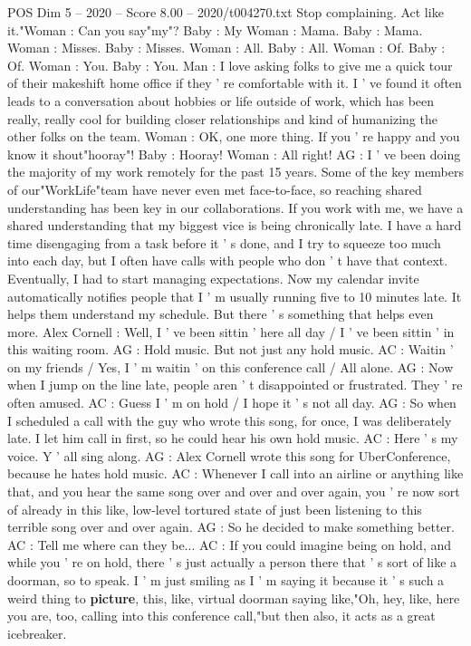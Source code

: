 \begin{textsample}{POS Dim 5 – 2020 – Score 8.00 – 2020/t004270.txt}
Stop complaining.
Act like it."Woman : Can you say"my"?
Baby : My Woman : Mama.
Baby : Mama.
Woman : Misses.
Baby : Misses.
Woman : All.
Baby : All.
Woman : Of.
Baby : Of.
Woman : You.
Baby : You.
Man : I love asking folks to give me a quick tour of their makeshift home office if they ' re comfortable with it.
I ' ve found it often leads to a conversation about hobbies or life outside of work, which has been really, really cool for building closer relationships and kind of humanizing the other folks on the team.
Woman : OK, one more thing.
If you ' re happy and you know it shout"hooray"!
Baby : Hooray!
Woman : All right!
AG : I ' ve been doing the majority of my work remotely for the past 15 years.
Some of the key members of our"WorkLife"team have never even met face-to-face, so reaching shared understanding has been key in our collaborations.
If you work with me, we have a shared understanding that my biggest vice is being chronically late.
I have a hard time disengaging from a task before it ' s done, and I try to squeeze too much into each day, but I often have calls with people who don ' t have that context.
Eventually, I had to start managing expectations.
Now my calendar invite automatically notifies people that I ' m usually running five to 10 minutes late.
It helps them understand my schedule.
But there ' s something that helps even more.
Alex Cornell : Well, I ' ve been sittin ' here all day / I ' ve been sittin ' in this waiting room.
AG : Hold music.
But not just any hold music.
AC : Waitin ' on my friends / Yes, I ' m waitin ' on this conference call / All alone.
AG : Now when I jump on the line late, people aren ' t disappointed or frustrated.
They ' re often amused.
AC : Guess I ' m on hold / I hope it ' s not all day.
AG : So when I scheduled a call with the guy who wrote this song, for once, I was deliberately late.
I let him call in first, so he could hear his own hold music.
AC : Here ' s my voice.
Y ' all sing along.
AG : Alex Cornell wrote this song for UberConference, because he hates hold music.
AC : Whenever I call into an airline or anything like that, and you hear the same song over and over and over again, you ' re now sort of already in this like, low-level tortured state of just been listening to this terrible song over and over again.
AG : So he decided to make something better.
AC : Tell me where can they be...
AC : If you could imagine being on hold, and while you ' re on hold, there ' s just actually a person there that ' s sort of like a doorman, so to speak.
I ' m just smiling as I ' m saying it because it ' s such a weird thing to \textbf{picture}, this, like, virtual doorman saying like,"Oh, hey, like, here you are, too, calling into this conference call,"but then also, it acts as a great icebreaker.

\end{textsample}
